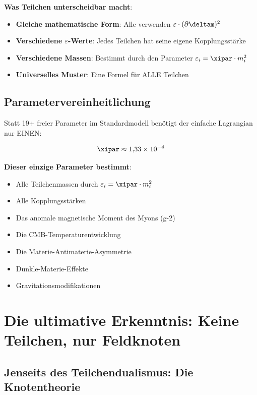 	\textbf{Was Teilchen unterscheidbar macht}:
	\begin{itemize}
		\item \textbf{Gleiche mathematische Form}: Alle verwenden $\varepsilon \cdot (\partial \deltam)^2$
		\item \textbf{Verschiedene $\varepsilon$-Werte}: Jedes Teilchen hat seine eigene Kopplungsstärke
		\item \textbf{Verschiedene Massen}: Bestimmt durch den Parameter $\varepsilon_i = \xipar \cdot m_i^2$
		\item \textbf{Universelles Muster}: Eine Formel für ALLE Teilchen
	\end{itemize}
	
	\subsection{Parametervereinheitlichung}
	
	Statt 19+ freier Parameter im Standardmodell benötigt der einfache Lagrangian nur EINEN:
	
	\begin{equation}
		\xipar \approx 1{,}33 \times 10^{-4}
		\label{eq:universal_parameter}
	\end{equation}
	
	\textbf{Dieser einzige Parameter bestimmt}:
	\begin{itemize}
		\item Alle Teilchenmassen durch $\varepsilon_i = \xipar \cdot m_i^2$
		\item Alle Kopplungsstärken
		\item Das anomale magnetische Moment des Myons (g-2)
		\item Die CMB-Temperaturentwicklung
		\item Die Materie-Antimaterie-Asymmetrie
		\item Dunkle-Materie-Effekte
		\item Gravitationsmodifikationen
	\end{itemize}
	
	\section{Die ultimative Erkenntnis: Keine Teilchen, nur Feldknoten}
	
	\subsection{Jenseits des Teilchendualismus: Die Knotentheorie}
	
